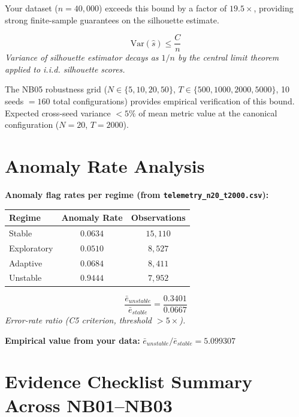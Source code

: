 \documentclass[12pt]{article}
\begin{document}
Your dataset ($n = 40,000$) exceeds this bound by a factor of $19.5\times$, providing strong finite-sample guarantees on the silhouette estimate.


\begin{equation}
\mathrm{Var}(\hat{s}) \leq \frac{C}{n}
\end{equation}
\noindent\textit{Variance of silhouette estimator decays as $1/n$ by the central limit theorem applied to i.i.d. silhouette scores.}


\noindent The NB05 robustness grid ($N \in \{5,10,20,50\}$, $T \in \{500,1000,2000,5000\}$, 10 seeds $= 160$ total configurations) provides empirical verification of this bound. Expected cross-seed variance $< 5\%$ of mean metric value at the canonical configuration ($N=20$, $T=2000$).



\section{Anomaly Rate Analysis}

\noindent\textbf{Anomaly flag rates per regime (from \texttt{telemetry\_n20\_t2000.csv}):}
\begin{center}\begin{tabular}{lcc}\toprule
Regime & Anomaly Rate & Observations \\ \midrule

Stable & $0.0634$ & $15,110$ \\

Exploratory & $0.0510$ & $8,527$ \\

Adaptive & $0.0684$ & $8,411$ \\

Unstable & $0.9444$ & $7,952$ \\

\bottomrule\end{tabular}\end{center}


\begin{equation}
\frac{\bar{e}_{unstable}}{\bar{e}_{stable}} = \frac{0.3401}{0.0667}
\end{equation}
\noindent\textit{Error-rate ratio (C5 criterion, threshold $> 5\times$).}

\noindent\textbf{Empirical value from your data:} $\bar{e}_{unstable}/\bar{e}_{stable} = 5.099307$



\section{Evidence Checklist Summary Across NB01–NB03}
\end{document}
